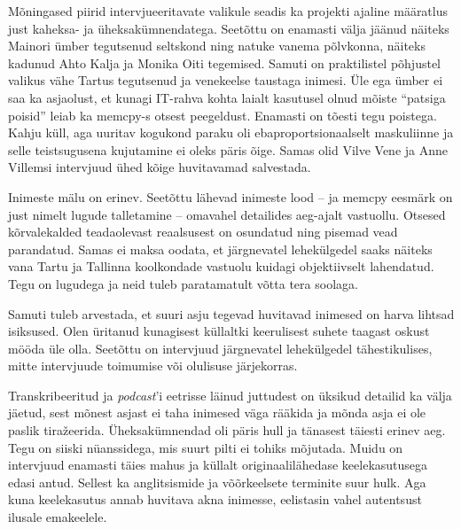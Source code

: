 Mõningased piirid intervjueeritavate valikule seadis ka projekti ajaline määratlus just 
kaheksa- ja üheksakümnendatega. Seetõttu on enamasti välja jäänud näiteks 
Mainori ümber tegutsenud seltskond ning natuke vanema põlvkonna, 
näiteks kadunud Ahto Kalja ja Monika 
Oiti tegemised. Samuti on praktilistel põhjustel 
valikus vähe Tartus tegutsenud ja venekeelse taustaga inimesi. Üle ega 
ümber ei saa ka asjaolust, et kunagi IT-rahva kohta laialt kasutusel olnud 
mõiste \enquote{patsiga poisid} leiab ka memcpy-s otsest peegeldust. Enamasti 
on tõesti tegu poistega. Kahju küll, aga uuritav kogukond paraku oli 
ebaproportsionaalselt maskuliinne ja selle teistsugusena kujutamine ei oleks 
päris õige. Samas olid Vilve Vene ja Anne 
Villemsi intervjuud ühed kõige huvitavamad salvestada.

Inimeste mälu on erinev. Seetõttu lähevad inimeste lood -- ja memcpy eesmärk on just nimelt lugude 
talletamine -- omavahel detailides aeg-ajalt vastuollu. Otsesed 
kõrvalekalded teadaolevast reaalsusest on osundatud ning pisemad vead 
parandatud. Samas ei maksa oodata, et järgnevatel lehekülgedel saaks näiteks vana 
Tartu ja Tallinna koolkondade vastuolu kuidagi objektiivselt lahendatud. 
Tegu on lugudega ja neid tuleb paratamatult võtta tera soolaga.

Samuti tuleb arvestada, et suuri asju tegevad huvitavad inimesed on harva 
lihtsad isiksused. Olen üritanud kunagisest küllaltki keerulisest suhete taagast 
oskust mööda üle olla. Seetõttu on intervjuud järgnevatel lehekülgedel 
tähestikulises, mitte intervjuude toimumise või olulisuse järjekorras. 

Transkribeeritud ja \emph{podcast}'i eetrisse läinud juttudest on üksikud 
detailid ka välja jäetud, sest mõnest asjast ei taha inimesed väga rääkida ja 
mõnda asja ei ole paslik tiražeerida. Üheksakümnendad oli päris hull ja 
tänasest täiesti erinev aeg. Tegu on siiski nüanssidega, mis suurt pilti ei 
tohiks mõjutada. Muidu on intervjuud enamasti täies mahus ja küllalt originaalilähedase keelekasutusega edasi antud. 
Sellest ka anglitsismide ja võõrkeelsete terminite suur hulk. 
Aga kuna keelekasutus annab huvitava akna inimesse, eelistasin vahel autentsust 
ilusale emakeelele.

